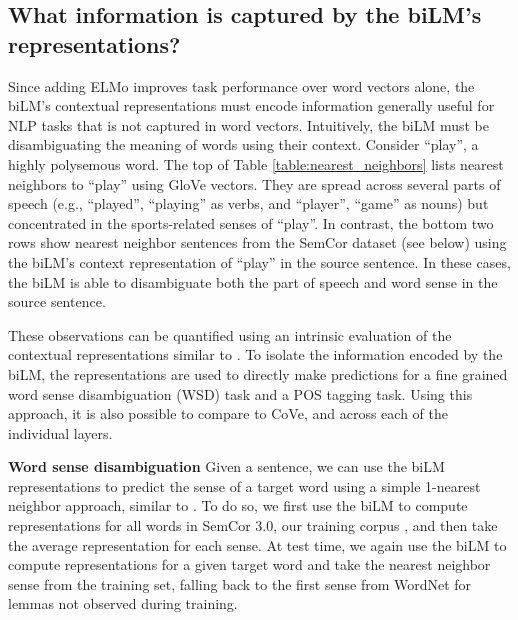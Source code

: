 \documentclass[11pt,a4paper]{article}
\newcommand{\ELMO}{ELMo}
\newcommand{\tinysection}[1]{\textbf{#1}}
\begin{document}
\subsection{What information is captured by the biLM's representations?}
\label{sec:what_info_bilm}
Since adding \ELMO{} improves task performance over word vectors alone, the biLM's contextual representations must encode information generally useful for NLP tasks that is not captured in word vectors.  Intuitively, the biLM must be disambiguating the meaning of words using their context.
Consider ``play'', a highly polysemous word.  The top of Table \ref{table:nearest_neighbors} lists nearest neighbors to ``play'' using GloVe vectors.
They are spread across several parts of speech (e.g., ``played'', ``playing'' as verbs, and ``player'', ``game'' as nouns) but concentrated in the sports-related senses of ``play''.
In contrast, the bottom two rows show nearest neighbor sentences from the SemCor dataset (see below) using the biLM's context representation of ``play'' in the source sentence.
In these cases, the biLM is able to disambiguate both the part of speech and word sense in the source sentence.

These observations can be quantified using an intrinsic evaluation of the contextual representations similar to \citet{Belinkov2017WhatDN}.
To isolate the information encoded by the biLM, the representations are used to directly make predictions for
a fine grained word sense disambiguation (WSD) task and a POS tagging task.
Using this approach, it is also possible to compare to CoVe, and across each of the individual layers.

\tinysection{Word sense disambiguation}
Given a sentence, we can use the biLM representations to predict the sense of a target word using a simple 1-nearest neighbor approach, similar to \citet{Melamud2016context2vecLG}.
To do so, we first use the biLM to compute representations for all words in SemCor 3.0, our training corpus \citep{Miller1994UsingAS}, and then take the average representation for each sense.
At test time, we again use the biLM to compute representations for a given target word and take the nearest neighbor sense from the training set, falling back to the first sense from WordNet for lemmas not observed during training.
\end{document}
